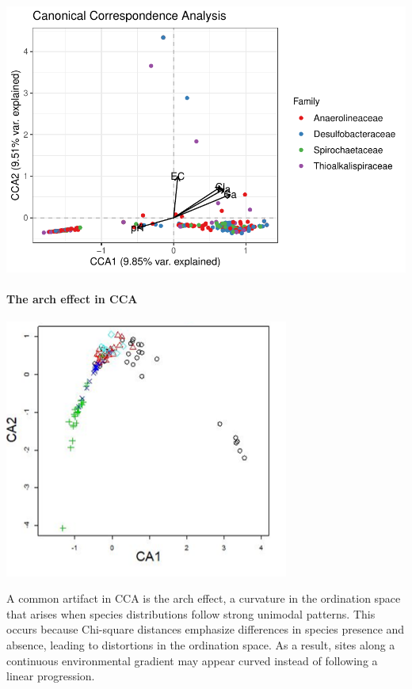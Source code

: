 \documentclass[
]{article}
\begin{document}
\includegraphics{workshop_files/figure-latex/unnamed-chunk-31-1.pdf}

\hypertarget{the-arch-effect-in-cca}{%
\paragraph{The arch effect in CCA}\label{the-arch-effect-in-cca}}

\includegraphics[width=0.7\textwidth,height=\textheight]{images/Fig11.png}

A common artifact in CCA is the arch effect, a curvature in the
ordination space that arises when species distributions follow strong
unimodal patterns. This occurs because Chi-square distances emphasize
differences in species presence and absence, leading to distortions in
the ordination space. As a result, sites along a continuous
environmental gradient may appear curved instead of following a linear
progression.
\end{document}
